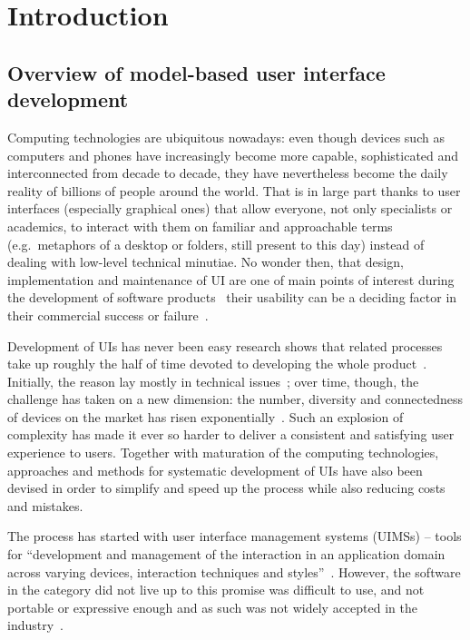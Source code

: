 \chapter{Introduction}\label{ch:introduction}

\section{Overview of model-based user interface development}\label{sec:user-interfaces-are-important}
Computing technologies are ubiquitous nowadays: even though devices such as computers and phones have increasingly become more capable, sophisticated and interconnected from decade to decade, they have nevertheless become the daily reality of billions of people around the world.
That is in large part thanks to user interfaces (especially graphical ones) that allow everyone, not only specialists or academics, to interact with them on familiar and approachable terms (e.g.\ metaphors of a desktop or folders, still present to this day) instead of dealing with low-level technical minutiae.
No wonder then, that design, implementation and maintenance of UI are one of main points of interest during the development of software products~\cite{Anderson2010}\,\textendash\,their usability can be a deciding factor in their commercial success or failure~\cite{Offutt2002}.

Development of UIs has never been easy\,\textendash\,research shows that related processes take up roughly the half of time devoted to developing the whole product~\cite{Myers1992}.
Initially, the reason lay mostly in technical issues~\cite{Six1991};
over time, though, the challenge has taken on a new dimension:
the number, diversity and connectedness of devices on the market has risen exponentially~\cite{Cisco2020}.
Such an explosion of complexity has made it ever so harder to deliver a consistent and satisfying user experience to users.
Together with maturation of the computing technologies, approaches and methods for systematic development of UIs have also been devised in order to simplify and speed up the process while also reducing costs and mistakes.

The process has started with user interface management systems (UIMSs) – tools for \enquote{development and management of the interaction in an application domain across varying devices, interaction techniques and styles}~\cite{Betts1987}.
However, the software in the category did not live up to this promise\,\textendash\,was difficult to use, and not portable or expressive enough\,\textendash\,and as such was not widely accepted in the industry~\cite{Myers1987}.

